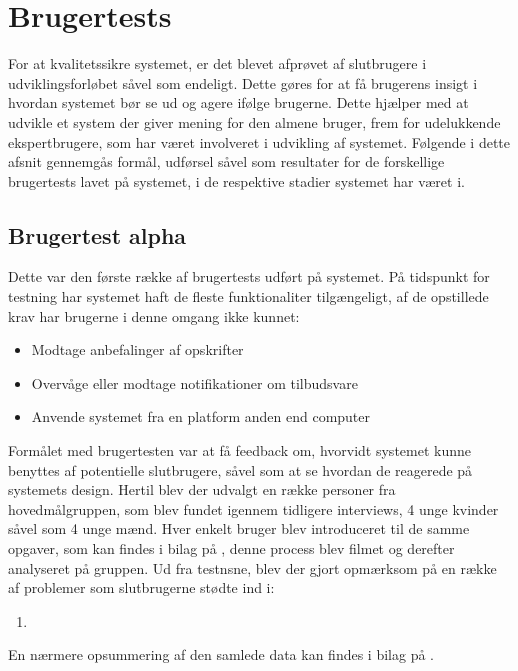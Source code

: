 \section{Brugertests}
For at kvalitetssikre systemet, er det blevet afprøvet af slutbrugere i udviklingsforløbet såvel som endeligt.
Dette gøres for at få brugerens insigt i hvordan systemet bør se ud og agere ifølge brugerne.
Dette hjælper med at udvikle et system der giver mening for den almene bruger, frem for udelukkende ekspertbrugere, som har været involveret i udvikling af systemet.
Følgende i dette afsnit gennemgås formål, udførsel såvel som resultater for de forskellige brugertests lavet på systemet, i de respektive stadier systemet har været i.


\subsection{Brugertest alpha}
Dette var den første række af brugertests udført på systemet.
På tidspunkt for testning har systemet haft de fleste funktionaliter tilgængeligt, af de opstillede krav har brugerne i denne omgang ikke kunnet:
\begin{itemize}
   \item{Modtage anbefalinger af opskrifter}
   \item{Overvåge eller modtage notifikationer om tilbudsvare}
   \item{Anvende systemet fra en platform anden end computer}
\end{itemize}
Formålet med brugertesten var at få feedback om, hvorvidt systemet kunne benyttes af potentielle slutbrugere, såvel som at se hvordan de reagerede på systemets design.
Hertil blev der udvalgt en række personer fra hovedmålgruppen, som blev fundet igennem tidligere interviews, 4 unge kvinder såvel som 4 unge mænd.
Hver enkelt bruger blev introduceret til de samme opgaver, som kan findes i bilag på \myref{}, denne process blev filmet og derefter analyseret på gruppen.
Ud fra testnsne, blev der gjort opmærksom på en række af problemer som slutbrugerne stødte ind i:
\begin{enumerate}
   \item
\end{enumerate}
En nærmere opsummering af den samlede data kan findes i bilag på \myref{}.